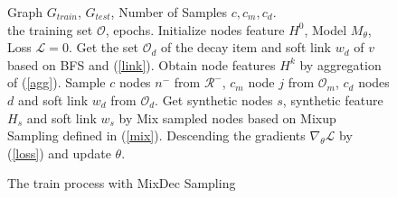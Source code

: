 \begin{figure}[t]
  
  \renewcommand{\algorithmicrequire}{\textbf{Input:}}
  \renewcommand{\algorithmicensure}{\textbf{Output:}}
  \removelatexerror
  
  \begin{algorithm}[H]
    \caption{The train process with MixDec Sampling}\label{alg}
    \begin{algorithmic}[1]
        \REQUIRE Graph $G_{train}$, $G_{test}$, Number of Samples $c, c_m, c_d$. \\the training set $\mathcal{O}$, epochs.
        \STATE Initialize nodes feature $H^0$, Model $M_{\theta}$, Loss $\mathcal{L} = 0$.
            \STATE Get the set $\mathcal{O}_d$ of the decay item and soft link $w_{d}$ of $\mathit{v}$  based on BFS and (\ref{link}).
        \ENDFOR
            \STATE Obtain node features $H^k$ by aggregation of (\ref{agg}).
  \STATE Sample $c$ nodes $\mathit{n}^-$ from $\mathcal{R}^-$, $c_m$ node $j$ from $\mathcal{O}_m$, $c_d$ nodes $d$ and soft link $w_d$ from $ \mathcal{O}_d$.
       \STATE Get synthetic nodes $s$, synthetic feature $H_s$ and soft link $w_s$ by Mix sampled nodes based on Mixup Sampling defined in (\ref{mix}).
            \ENDFOR
    \STATE Descending the gradients $\nabla_{\theta}\mathcal{L}$ by (\ref{loss}) and update $\theta$.
        \ENDFOR

    \end{algorithmic}
  \end{algorithm}
  
\end{figure}



